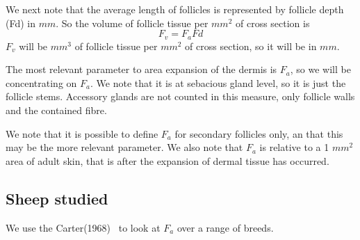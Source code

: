 \documentclass[titlepage]{article}  %
\begin{document}
We next note that the average length of follicles is represented by follicle depth (Fd) in $mm$.  So the volume of follicle tissue per $mm^{2}$  of cross section is
\begin{displaymath}
F_{v} = F_{a} Fd
\end{displaymath}
$F_{v}$ will be $mm^{3}$ of follicle tissue per $mm^{2}$ of cross section, so it will be in $mm$.

The most relevant parameter to area expansion of the dermis is $F_{a}$, so we will be concentrating on $F_{a}$. We note that it is at sebacious gland level, so it is just the follicle stems. Accessory glands are not counted in this measure, only follicle walls and the contained fibre.

We note that it is possible to define $F_{a}$ for secondary follicles only, an that this may be the more relevant parameter. We also note that $F_{a}$ is relative to a 1 $mm^{2}$ area of adult skin, that is after the expansion of dermal tissue has occurred.

\subsection{Sheep studied}
We use the Carter(1968)~\cite{cart:68} to look at $F_{a}$ over a range of breeds.
\end{document}
